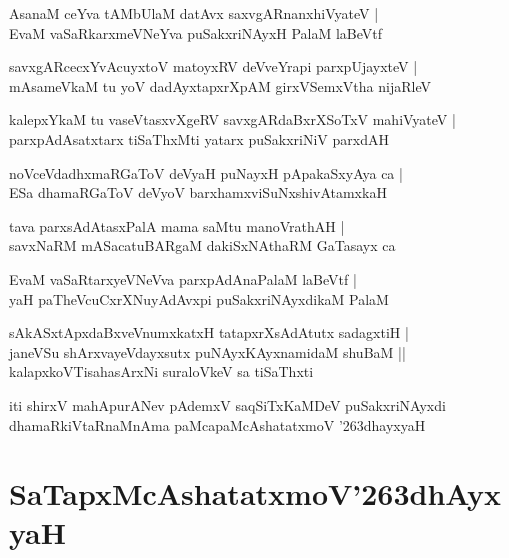 \documentclass[twoside,12pt,openright]{book}
\def\S{\char'263}
\newcounter{shloka}[chapter]
\begin{document}
\begin{shloka}%
AsanaM ceYva tAMbUlaM datAvx saxvgARnanxhiVyateV |\\
EvaM vaSaRkarxmeVNeYva puSakxriNAyxH PalaM laBeVtf
\end{shloka}

\begin{shloka}%
savxgARcecxYvAcuyxtoV matoyxRV deVveYrapi parxpUjayxteV |\\
mAsameVkaM tu yoV dadAyxtapxrXpAM girxVSemxVtha nijaRleV 
\end{shloka}

\begin{shloka}%
kalepxYkaM tu vaseVtasxvXgeRV savxgARdaBxrXSoTxV mahiVyateV |\\
parxpAdAsatxtarx tiSaThxMti yatarx puSakxriNiV parxdAH 
\end{shloka}

\begin{shloka}%
noVceVdadhxmaRGaToV deVyaH puNayxH pApakaSxyAya ca |\\
ESa dhamaRGaToV deVyoV barxhamxviSuNxshivAtamxkaH
\end{shloka}

\begin{shloka}%
tava parxsAdAtasxPalA mama saMtu manoVrathAH |\\
savxNaRM mASacatuBARgaM dakiSxNAthaRM GaTasayx ca 
\end{shloka}

\begin{shloka}%
EvaM vaSaRtarxyeVNeVva parxpAdAnaPalaM laBeVtf |\\
yaH paTheVcuCxrXNuyAdAvxpi puSakxriNAyxdikaM PalaM
\end{shloka}

\begin{shloka}%
sAkASxtApxdaBxveVnumxkatxH tatapxrXsAdAtutx sadagxtiH |\\
janeVSu shArxvayeVdayxsutx puNAyxKAyxnamidaM shuBaM ||\\
kalapxkoVTisahasArxNi suraloVkeV sa tiSaThxti
\end{shloka}

\begin{center}
iti shirxV mahApurANev pAdemxV saqSiTxKaMDeV puSakxriNAyxdi dhamaRkiVtaRnaMnAma paMcapaMcAshatatxmoV
\S dhayxyaH
\end{center}

\chapter{SaTapxMcAshatatxmoV\S dhAyxyaH}
\end{document}
